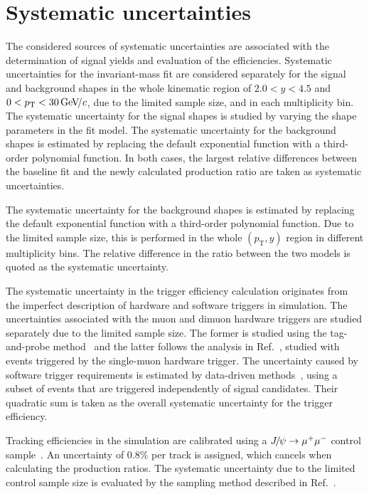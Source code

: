 \documentclass[12pt,a4paper]{article}
\def\Pmu         {\ensuremath{\upmu}\xspace}
\def\Ppsi        {\ensuremath{\uppsi}\xspace}
\def\PJ      {\ensuremath{\mathrm{J}}\xspace}
\def\Pmu         {\ensuremath{\mu}\xspace}
\def\Ppsi        {\ensuremath{\psi}\xspace}
\def\PJ      {\ensuremath{J}\xspace}
\def\mup        {{\ensuremath{\Pmu^+}}\xspace}
\def\mun        {{\ensuremath{\Pmu^-}}\xspace} \def\mupm       {{\ensuremath{\Pmu^\pm}}\xspace}
\def\jpsi     {{\ensuremath{{\PJ\mskip -3mu/\mskip -2mu\Ppsi}}}\xspace}
\newcommand{\aunit}[1]{\ensuremath{\text{\,#1}}}
\newcommand{\gevc}{\ensuremath{\aunit{Ge\kern -0.1em V\!/}c}\xspace}
\def\pt         {\ensuremath{p_{\mathrm{T}}}\xspace}
\begin{document}
\section{Systematic uncertainties}
\label{sec:systematics}
The considered sources of systematic uncertainties are associated with the determination of signal yields and evaluation of the efficiencies. 
Systematic uncertainties for the invariant-mass fit are 
considered separately for the signal and background shapes in the whole kinematic region of $2.0 < y < 4.5$ and $0 
< \pt < 30 \gevc$, due to the limited sample size, and in each multiplicity bin. The systematic uncertainty for 
the signal shapes is studied by varying the shape parameters in the fit model.  The systematic uncertainty for 
the background shapes is estimated by replacing the default exponential function with a third-order polynomial 
function. In both cases, the largest relative differences between the baseline fit and the newly calculated 
production ratio are taken as systematic uncertainties.

The systematic uncertainty for the background shapes is estimated by replacing the default exponential function with a third-order polynomial function. Due to the limited sample size, this is performed in the whole $(\pt,y)$ region in different multiplicity bins. The relative difference in the ratio between the two models is quoted as the systematic uncertainty. 




The systematic uncertainty in the trigger efficiency calculation originates from the imperfect description of hardware and software triggers in simulation. 
The uncertainties associated with the muon and dimuon hardware triggers are studied separately due to the limited sample size. The former is studied using the tag-and-probe method~\cite{LHCb-DP-2014-002} and the latter follows the analysis in Ref.~\cite{LHCb-PAPER-2018-002}, studied with events
triggered by the single-muon hardware trigger. The uncertainty caused by software trigger requirements is estimated by data-driven methods~\cite{LHCb-DP-2012-004}, using a subset of events that are triggered independently of signal candidates.
Their quadratic sum is taken as the overall systematic uncertainty for the trigger efficiency. 

Tracking efficiencies in the simulation are calibrated using a $\jpsi\rightarrow\mup\mun$ control sample~\cite{LHCb-DP-2013-002}. An uncertainty of $0.8\%$ per track is assigned, which cancels when calculating the production ratios. The systematic uncertainty due to the limited control sample size is evaluated by the sampling method described in Ref.~\cite{LHCb:2023xie}.
\end{document}
